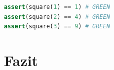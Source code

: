 \documentclass[a0,landscape]{a0poster}
\begin{document}
\begin{multicols}{4}
\begin{lstlisting}[language=Python]
assert(square(1) == 1) # GREEN
assert(square(2) == 4) # GREEN
assert(square(3) == 9) # GREEN
\end{lstlisting}

\color{SaddleBrown}
\section*{Fazit}


\color{DarkSlateGray}


\nocite{*} %



\end{multicols}
\end{document}
